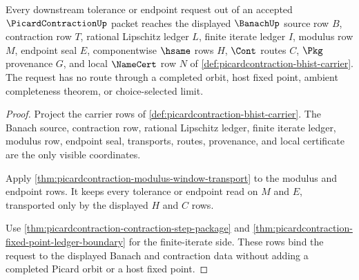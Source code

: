 \begin{theorem}
\label{thm:picardcontraction-downstream-modulus-exposure}
Every downstream tolerance or endpoint request out of an accepted $\PicardContractionUp$ packet reaches the displayed $\BanachUp$ source row $B$, contraction row $T$, rational Lipschitz ledger $L$, finite iterate ledger $I$, modulus row $M$, endpoint seal $E$, componentwise $\hsame$ rows $H$, $\Cont$ routes $C$, $\Pkg$ provenance $G$, and local $\NameCert$ row $N$ of \autoref{def:picardcontraction-bhist-carrier}. The request has no route through a completed orbit, host fixed point, ambient completeness theorem, or choice-selected limit.
\end{theorem}
\begin{proof}
Project the carrier rows of \autoref{def:picardcontraction-bhist-carrier}. The Banach source, contraction row, rational Lipschitz ledger, finite iterate ledger, modulus row, endpoint seal, transports, routes, provenance, and local certificate are the only visible coordinates.

Apply \autoref{thm:picardcontraction-modulus-window-transport} to the modulus and endpoint rows. It keeps every tolerance or endpoint read on $M$ and $E$, transported only by the displayed $H$ and $C$ rows.

Use \autoref{thm:picardcontraction-contraction-step-package} and \autoref{thm:picardcontraction-fixed-point-ledger-boundary} for the finite-iterate side. These rows bind the request to the displayed Banach and contraction data without adding a completed Picard orbit or a host fixed point.
\end{proof}

